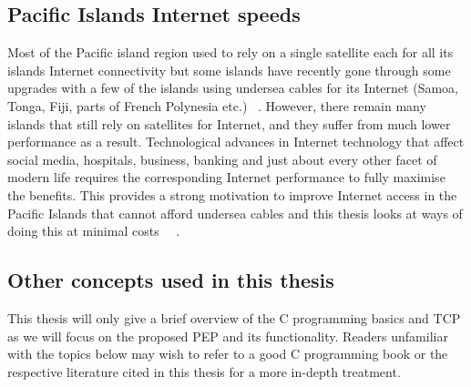 \subsection{Pacific Islands Internet speeds}

Most of the Pacific island region used to rely on a single satellite each for all its islands Internet connectivity but some islands have recently gone through some upgrades with a few of the islands using undersea cables for its Internet (Samoa, Tonga, Fiji, parts of French Polynesia etc.) ~\cite{3}. However, there remain many islands that still rely on satellites for Internet, and they suffer from much lower performance as a result. Technological advances in Internet technology that affect social media, hospitals, business, banking  and just about every other facet of modern life requires the corresponding Internet performance to fully maximise the benefits. This provides a strong motivation to improve Internet access in the Pacific Islands that cannot afford undersea cables and this thesis looks at ways of doing this at minimal costs ~\cite{3}~\cite{4}.


\subsection{Other concepts used in this thesis}
This thesis will only give a brief overview of the C programming basics and TCP as we will focus on the proposed PEP and its functionality. Readers unfamiliar with the topics below may wish to refer to a good C programming book or the respective literature cited in this thesis for a more in-depth treatment.

